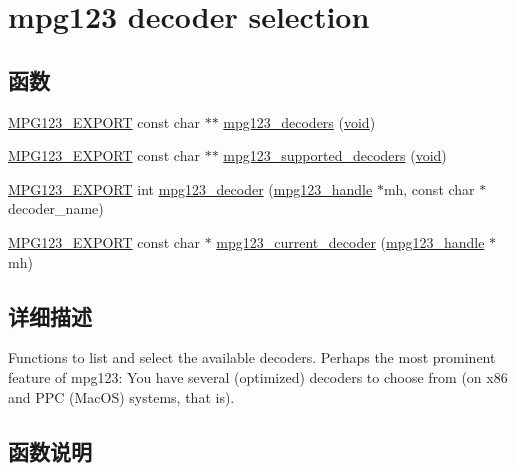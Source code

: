 \hypertarget{group__mpg123__decoder}{}\section{mpg123 decoder selection}
\label{group__mpg123__decoder}
\subsection*{函数}
\begin{DoxyCompactItemize}
\item 
\hyperlink{mpg123_8h_a2ba98cfba3f760879df70e755b2a61cc}{M\+P\+G123\+\_\+\+E\+X\+P\+O\+RT} const char $\ast$$\ast$ \hyperlink{group__mpg123__decoder_gaaa1b0af58f5f9654c736ccb24dcf0475}{mpg123\+\_\+decoders} (\hyperlink{interfacevoid}{void})
\item 
\hyperlink{mpg123_8h_a2ba98cfba3f760879df70e755b2a61cc}{M\+P\+G123\+\_\+\+E\+X\+P\+O\+RT} const char $\ast$$\ast$ \hyperlink{group__mpg123__decoder_gaa74de136a5a49d0b420707e98e91a789}{mpg123\+\_\+supported\+\_\+decoders} (\hyperlink{interfacevoid}{void})
\item 
\hyperlink{mpg123_8h_a2ba98cfba3f760879df70e755b2a61cc}{M\+P\+G123\+\_\+\+E\+X\+P\+O\+RT} int \hyperlink{group__mpg123__decoder_gae21df3e432dc90e9983d9fea25372cdc}{mpg123\+\_\+decoder} (\hyperlink{group__mpg123__init_ga6728e2839a395f3a07d4514da659faca}{mpg123\+\_\+handle} $\ast$mh, const char $\ast$decoder\+\_\+name)
\item 
\hyperlink{mpg123_8h_a2ba98cfba3f760879df70e755b2a61cc}{M\+P\+G123\+\_\+\+E\+X\+P\+O\+RT} const char $\ast$ \hyperlink{group__mpg123__decoder_gaa9e1be14b204d271ab57b679894c10e2}{mpg123\+\_\+current\+\_\+decoder} (\hyperlink{group__mpg123__init_ga6728e2839a395f3a07d4514da659faca}{mpg123\+\_\+handle} $\ast$mh)
\end{DoxyCompactItemize}


\subsection{详细描述}
Functions to list and select the available decoders. Perhaps the most prominent feature of mpg123\+: You have several (optimized) decoders to choose from (on x86 and P\+PC (Mac\+OS) systems, that is). 

\subsection{函数说明}
\mbox{\label{group__mpg123__decoder_gaa9e1be14b204d271ab57b679894c10e2}} 
